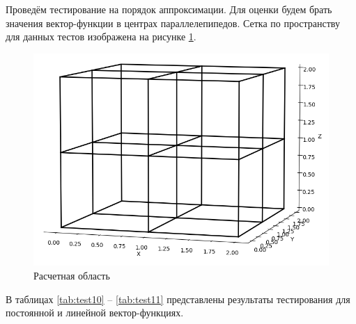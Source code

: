 Проведём тестирование на порядок аппроксимации. Для оценки будем брать значения вектор-функции в центрах параллелепипедов. Сетка по пространству для данных тестов изображена на рисунке \ref{fig:exampleOfArea_1}.

\begin{figure}
	\centering
	\vspace*{0.7cm}
	\includegraphics[width=0.5\linewidth]{images/3D_mesh_1.png}
	\caption{Расчетная область}
	\label{fig:exampleOfArea_1}
\end{figure}

В таблицах \ref{tab:test10} -- \ref{tab:test11} представлены результаты тестирования для постоянной и линейной вектор-функциях.

